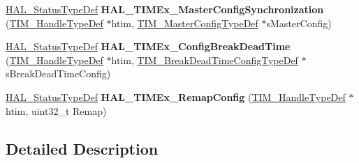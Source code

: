 \begin{DoxyCompactItemize}
\hyperlink{stm32f0xx__hal__def_8h_a63c0679d1cb8b8c684fbb0632743478f}{H\+A\+L\+\_\+\+Status\+Type\+Def} {\bfseries H\+A\+L\+\_\+\+T\+I\+M\+Ex\+\_\+\+Master\+Config\+Synchronization} (\hyperlink{struct_t_i_m___handle_type_def}{T\+I\+M\+\_\+\+Handle\+Type\+Def} $\ast$htim, \hyperlink{struct_t_i_m___master_config_type_def}{T\+I\+M\+\_\+\+Master\+Config\+Type\+Def} $\ast$s\+Master\+Config)
\item 
\mbox{\label{group___t_i_m_ex___exported___functions___group5_ga4414f3b3dcbed3f21ee3b06d6db9ffa4}} 
\hyperlink{stm32f0xx__hal__def_8h_a63c0679d1cb8b8c684fbb0632743478f}{H\+A\+L\+\_\+\+Status\+Type\+Def} {\bfseries H\+A\+L\+\_\+\+T\+I\+M\+Ex\+\_\+\+Config\+Break\+Dead\+Time} (\hyperlink{struct_t_i_m___handle_type_def}{T\+I\+M\+\_\+\+Handle\+Type\+Def} $\ast$htim, \hyperlink{struct_t_i_m___break_dead_time_config_type_def}{T\+I\+M\+\_\+\+Break\+Dead\+Time\+Config\+Type\+Def} $\ast$s\+Break\+Dead\+Time\+Config)
\item 
\mbox{\label{group___t_i_m_ex___exported___functions___group5_ga683118282daf3aa2e319eb8eea93af31}} 
\hyperlink{stm32f0xx__hal__def_8h_a63c0679d1cb8b8c684fbb0632743478f}{H\+A\+L\+\_\+\+Status\+Type\+Def} {\bfseries H\+A\+L\+\_\+\+T\+I\+M\+Ex\+\_\+\+Remap\+Config} (\hyperlink{struct_t_i_m___handle_type_def}{T\+I\+M\+\_\+\+Handle\+Type\+Def} $\ast$htim, uint32\+\_\+t Remap)
\end{DoxyCompactItemize}


\subsection{Detailed Description}
